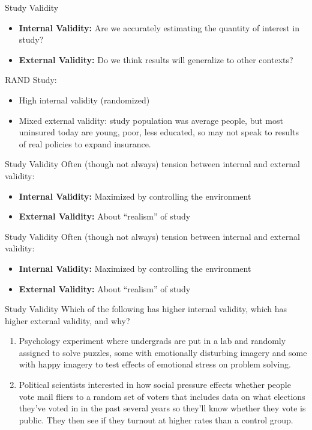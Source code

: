 \documentclass[11pt]{beamer}
\begin{document}
\begin{frame}[c]{Study Validity}
  \begin{itemize}
    \item \textbf{Internal Validity:} Are we accurately estimating the quantity of interest in study?
    \item \textbf{External Validity:} Do we think results will generalize to other contexts?
  \end{itemize}
\pause RAND Study:
\begin{itemize}
  \item High internal validity (randomized)
  \item Mixed external validity: study population was average people, but most uninsured today are young, poor, less educated, so may not speak to results of real policies to expand insurance.
\end{itemize}
\end{frame}

\begin{frame}[c]{Study Validity}
Often (though not always) tension between internal and external validity:
  \begin{itemize}
    \item \textbf{Internal Validity:} Maximized by controlling the environment
    \item \textbf{External Validity:} About ``realism'' of study
  \end{itemize}
\end{frame}

\begin{frame}[c]{Study Validity}
Often (though not always) tension between internal and external validity:
  \begin{itemize}
    \pause \item \textbf{Internal Validity:} Maximized by controlling the environment
    \item \textbf{External Validity:} About ``realism'' of study
  \end{itemize}
\end{frame}

\begin{frame}[c]{Study Validity}
Which of the following has higher internal validity, which has higher external validity, and why?
\begin{enumerate}
  \item Psychology experiment where undergrads are put in a lab and randomly assigned to solve puzzles, some with emotionally disturbing imagery and some with happy imagery to test effects of emotional stress on problem solving.
  \item Political scientists interested in how social pressure effects whether people vote mail fliers to a random set of voters that includes data on what elections they've voted in in the past several years so they'll know whether they vote is public. They then see if they turnout at higher rates than a control group.
\end{enumerate}
\end{frame}
\end{document}
